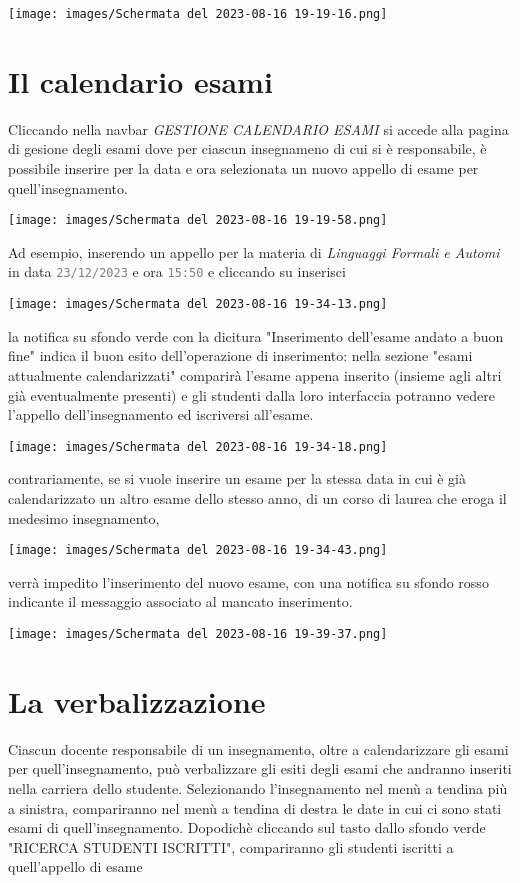 \documentclass{article}
\newcommand{\attr}[1]{\texttt{\textcolor{gray}{#1}}}
\begin{document}
    \texttt{[image: images/Schermata del 2023-08-16 19-19-16.png]}

    \section{Il calendario esami}
    Cliccando nella navbar \textit{GESTIONE CALENDARIO ESAMI} si accede alla pagina di gesione degli esami dove per ciascun insegnameno di cui si è responsabile, è possibile inserire per la data e ora selezionata un nuovo appello di esame per quell'insegnamento.

    \texttt{[image: images/Schermata del 2023-08-16 19-19-58.png]}

    Ad esempio, inserendo un appello per la materia di \textit{Linguaggi Formali e Automi} in data \attr{23/12/2023} e ora \attr{15:50} e cliccando su inserisci

    \texttt{[image: images/Schermata del 2023-08-16 19-34-13.png]}

    la notifica su sfondo verde con la dicitura "Inserimento dell'esame andato a buon fine" indica il buon esito dell'operazione di inserimento: nella sezione "esami attualmente calendarizzati" comparirà l'esame appena inserito (insieme agli altri già eventualmente presenti) e gli studenti dalla loro interfaccia potranno vedere l'appello dell'insegnamento ed iscriversi all'esame.

    \texttt{[image: images/Schermata del 2023-08-16 19-34-18.png]}

    contrariamente, se si vuole inserire un esame per la stessa data in cui è già calendarizzato un altro esame dello stesso anno, di un corso di laurea che eroga il medesimo insegnamento,

    \texttt{[image: images/Schermata del 2023-08-16 19-34-43.png]}

    verrà impedito l'inserimento del nuovo esame, con una notifica su sfondo rosso indicante il messaggio associato al mancato inserimento.

    \texttt{[image: images/Schermata del 2023-08-16 19-39-37.png]}

    \section{La verbalizzazione}
    Ciascun docente responsabile di un insegnamento, oltre a calendarizzare gli esami per quell'insegnamento, può verbalizzare gli esiti degli esami che andranno inseriti nella carriera dello studente.
    Selezionando l'insegnamento nel menù a tendina più a sinistra, compariranno nel menù a tendina di destra le date in cui ci sono stati esami di quell'insegnamento. Dopodichè cliccando sul tasto dallo sfondo verde "RICERCA STUDENTI ISCRITTI", compariranno gli studenti iscritti a quell'appello di esame
\end{document}
